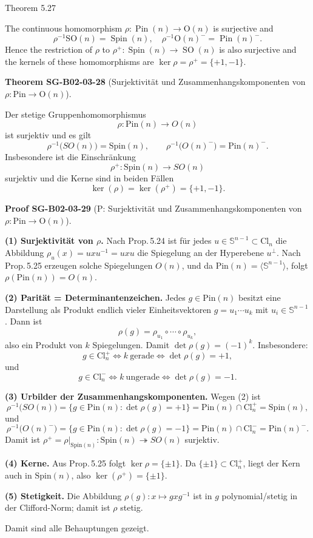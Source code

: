 \documentclass[10pt, letterpaper]{article}
\newcommand{\Cl}{\mathrm{Cl}}
\newcommand{\Spin}{\mathrm{Spin}}
\newcommand{\Pin}{\mathrm{Pin}}
\newcommand{\Ogroup}{\mathrm{O}}
\newcommand{\CustomHeading}[3]{%
  \par\medskip\noindent%
  \textbf{#1 #2} \textnormal{(#3)}.\enskip%
}
\newenvironment{THEO}[2]{\begin{unitbox}\CustomHeading{Theorem}{#1}{#2}}{\end{unitbox}}
\newenvironment{PROOF}[2]{\begin{unitbox}\CustomHeading{Proof}{#1}{#2}}{\end{unitbox}}
\begin{document}
Theorem 5.27

The continuous homomorphism $\rho: \operatorname{Pin}(n) \longrightarrow \mathrm{O}(n)$ is surjective and
$$
\rho^{-1} \mathrm{SO}(n)=\operatorname{Spin}(n), \quad \rho^{-1} \mathrm{O}(n)^{-}=\operatorname{Pin}(n)^{-} .
$$
Hence the restriction of $\rho$ to $\rho^{+}: \operatorname{Spin}(n) \longrightarrow \operatorname{SO}(n)$ is also surjective and the kernels of these homomorphisms are $\operatorname{ker} \rho=\rho^{+}=\{+1,-1\}$.


\begin{THEO}{SG-B02-03-28}{Surjektivität und Zusammenhangskomponenten von $\rho: \Pin\to \Ogroup(n)$}
Der stetige Gruppenhomomorphismus
\[
\rho:\Pin(n)\longrightarrow O(n)
\]
ist surjektiv und es gilt
\[
\rho^{-1}\!\bigl(SO(n)\bigr)=\Spin(n),\qquad
\rho^{-1}\!\bigl(O(n)^{-}\bigr)=\Pin(n)^{-}.
\]
Insbesondere ist die Einschränkung
\[
\rho^{+}:\Spin(n)\longrightarrow SO(n)
\]
surjektiv und die Kerne sind in beiden Fällen
\[
\ker(\rho)=\ker(\rho^{+})=\{+1,-1\}.
\]
\end{THEO}



\begin{PROOF}{SG-B02-03-29}{P: Surjektivität und Zusammenhangskomponenten von $\rho: \Pin\to \Ogroup(n)$}
\textbf{(1) Surjektivität von \(\rho\).}
Nach Prop.\,5.24 ist für jedes \(u\in\mathbb S^{n-1}\subset\Cl_n\) die Abbildung
\(\rho_u(x)=uxu^{-1}=uxu\) die Spiegelung an der Hyperebene \(u^\perp\).
Nach Prop.\,5.25 erzeugen solche Spiegelungen \(O(n)\), und da
\(\Pin(n)=\langle\mathbb S^{n-1}\rangle\), folgt \(\rho(\Pin(n))=O(n)\).

\smallskip
\textbf{(2) Parität = Determinantenzeichen.}
Jedes \(g\in\Pin(n)\) besitzt eine Darstellung als Produkt endlich vieler
Einheitsvektoren \(g=u_1\cdots u_k\) mit \(u_i\in\mathbb S^{n-1}\).
Dann ist
\[
\rho(g)=\rho_{u_1}\circ\cdots\circ\rho_{u_k},
\]
also ein Produkt von \(k\) Spiegelungen. Damit
\(\det \rho(g)=(-1)^k\). Insbesondere:
\[
g\in\Cl_n^{+}\iff k\ \text{gerade}\iff \det\rho(g)=+1,
\]
und
\[
g\in\Cl_n^{-}\iff k\ \text{ungerade}\iff \det\rho(g)=-1.
\]

\smallskip
\textbf{(3) Urbilder der Zusammenhangskomponenten.}
Wegen (2) ist
\[
\rho^{-1}\!\bigl(SO(n)\bigr)=\{g\in\Pin(n):\det\rho(g)=+1\}
=\Pin(n)\cap\Cl_n^{+}=\Spin(n),
\]
und
\[
\rho^{-1}\!\bigl(O(n)^{-}\bigr)=\{g\in\Pin(n):\det\rho(g)=-1\}
=\Pin(n)\cap\Cl_n^{-}=\Pin(n)^{-}.
\]
Damit ist \(\rho^{+}=\rho|_{\Spin(n)}:\Spin(n)\twoheadrightarrow SO(n)\) surjektiv.

\smallskip
\textbf{(4) Kerne.}
Aus Prop.\,5.25 folgt \(\ker\rho=\{\pm1\}\).
Da \(\{\pm1\}\subset\Cl_n^{+}\), liegt der Kern auch in \(\Spin(n)\), also
\(\ker(\rho^{+})=\{\pm1\}\).

\smallskip
\textbf{(5) Stetigkeit.}
Die Abbildung \(\rho(g):x\mapsto g x g^{-1}\) ist in \(g\) polynomial/stetig in der
Clifford-Norm; damit ist \(\rho\) stetig.

Damit sind alle Behauptungen gezeigt.
\end{PROOF}
\end{document}

